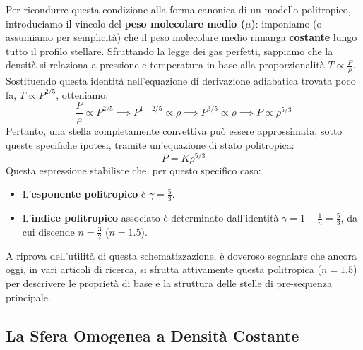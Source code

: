 Per ricondurre questa condizione alla forma canonica di un modello politropico, introduciamo il vincolo del \textbf{peso molecolare medio ($\mu$)}: imponiamo (o assumiamo per semplicità) che il peso molecolare medio rimanga \textbf{costante} lungo tutto il profilo stellare. Sfruttando la legge dei gas perfetti, sappiamo che la densità si relaziona a pressione e temperatura in base alla proporzionalità $T \propto \frac{P}{\rho}$. Sostituendo questa identità nell'equazione di derivazione adiabatica trovata poco fa, $T \propto P^{2/5}$, otteniamo:
\begin{equation}
\frac{P}{\rho} \propto P^{2/5} \implies P^{1 - 2/5} \propto \rho \implies P^{3/5} \propto \rho \implies P \propto \rho^{5/3}
\end{equation}
Pertanto, una stella completamente convettiva può essere approssimata, sotto queste specifiche ipotesi, tramite un'equazione di stato politropica:
\begin{equation}
P = K \rho^{5/3}
\end{equation}
Questa espressione stabilisce che, per questo specifico caso:
\begin{itemize}
\item L'\textbf{esponente politropico} è $\gamma = \frac{5}{3}$.
\item L'\textbf{indice politropico} associato è determinato dall'identità $\gamma = 1 + \frac{1}{n} = \frac{5}{3}$, da cui discende $n = \frac{3}{2}$ ($n = 1.5$).
\end{itemize}
A riprova dell'utilità di questa schematizzazione, è doveroso segnalare che ancora oggi, in vari articoli di ricerca, si sfrutta attivamente questa politropica ($n = 1.5$) per descrivere le proprietà di base e la struttura delle stelle di pre-sequenza principale.

\subsection{La Sfera Omogenea a Densità Costante}

